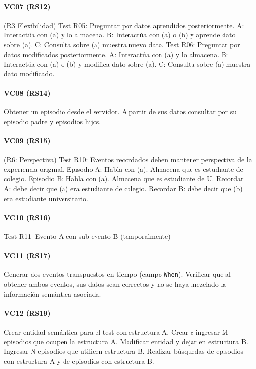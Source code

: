 \paragraph{VC07 (RS12)}
(R3 Flexibilidad)
Test R05: Preguntar por datos aprendidos posteriormente.
A: Interactúa con (a) y lo almacena.
B: Interactúa con (a) o (b) y aprende dato sobre (a).
C: Consulta sobre (a) muestra nuevo dato.
Test R06: Preguntar por datos modificados posteriormente.
A: Interactúa con (a) y lo almacena.
B: Interactúa con (a) o (b) y modifica dato sobre (a).
C: Consulta sobre (a) muestra dato modificado.


\paragraph{VC08 (RS14)}
Obtener un episodio desde el servidor. A partir de sus datos consultar por su episodio padre y episodios hijos.

\paragraph{VC09 (RS15)}
(R6: Perspectiva)
Test R10: Eventos recordados deben mantener perspectiva de la experiencia original.
Episodio A: Habla con (a). Almacena que es estudiante de colegio.
Episodio B: Habla con (a). Almacena que es estudiante de U.
Recordar A: debe decir que (a) era estudiante de colegio.
Recordar B: debe decir que (b) era estudiante universitario. 


\paragraph{VC10 (RS16)}
Test R11: Evento A con sub evento B (temporalmente)




\paragraph{VC11 (RS17)}
Generar dos eventos transpuestos en tiempo (campo \texttt{When}). Verificar que al obtener ambos eventos, sus datos sean correctos y no se haya mezclado la información semántica asociada.


\paragraph{VC12 (RS19)}
Crear entidad semántica para el test con estructura A. Crear e ingresar M episodios que ocupen la estructura A. Modificar entidad y dejar en estructura B. Ingresar N episodios que utilicen estructura B. Realizar búsquedas de episodios con estructura A y de episodios con estructura B.


